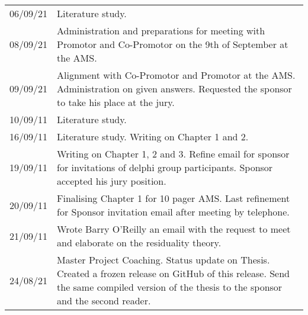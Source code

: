 \begin{longtable}{p{}p{}}
			06/09/21 & Literature study.\\%
			08/09/21 & Administration and preparations for meeting with Promotor and Co-Promotor on the 9th of September at the AMS.\\%
			09/09/21 & Alignment with Co-Promotor and Promotor at the AMS. Administration on given answers. Requested the sponsor to take his place at the jury.\\%
			10/09/11 & Literature study.\\%
			16/09/11 & Literature study. Writing on Chapter 1 and 2.\\%
			19/09/11 & Writing on Chapter 1, 2 and 3. Refine email for sponsor for invitations of delphi group participants. Sponsor accepted his jury position.\\%
			20/09/11 & Finalising Chapter 1 for 10 pager AMS. Last refinement for Sponsor invitation email after meeting by telephone. \\ 
			21/09/11 & Wrote Barry O'Reilly an email with the request to meet and elaborate on the residuality theory.\\%
			24/08/21 & Master Project Coaching. Status update on Thesis. Created a frozen release on GitHub of this release. Send the same compiled version of the thesis to the sponsor and the second reader.\\%
			\bottomrule %
\end{longtable}